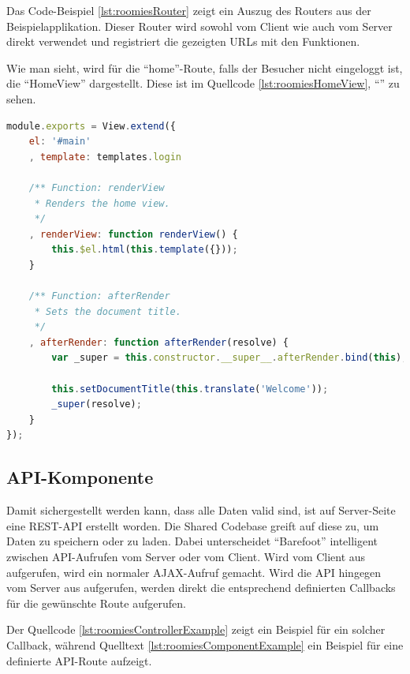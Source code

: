 Das Code-Beispiel \ref{lst:roomiesRouter} zeigt ein Auszug des Routers aus der Beispielapplikation.
Dieser Router wird sowohl vom Client wie auch vom Server direkt verwendet und registriert die gezeigten URLs mit den Funktionen.

Wie man sieht, wird für die ``home''-Route, falls der Besucher nicht eingeloggt ist, die ``HomeView'' dargestellt. Diese ist im Quellcode \ref{lst:roomiesHomeView}, ``'' zu sehen.

\begin{lstlisting}[language=JavaScript, caption=Router der Beispielapplikation, label=lst:roomiesHomeView]
module.exports = View.extend({
	el: '#main'
	, template: templates.login

	/** Function: renderView
	 * Renders the home view.
	 */
	, renderView: function renderView() {
		this.$el.html(this.template({}));
	}

	/** Function: afterRender
	 * Sets the document title.
	 */
	, afterRender: function afterRender(resolve) {
		var _super = this.constructor.__super__.afterRender.bind(this);

		this.setDocumentTitle(this.translate('Welcome'));
		_super(resolve);
	}
});
\end{lstlisting}

\subsection{API-Komponente}
Damit sichergestellt werden kann, dass alle Daten valid sind, ist auf Server-Seite
eine REST-API \cite{REST} erstellt worden. Die Shared Codebase greift auf diese zu, um
Daten zu speichern oder zu laden.
Dabei unterscheidet ``Barefoot'' intelligent zwischen API-Aufrufen vom Server oder vom Client.
Wird vom Client aus aufgerufen, wird ein normaler AJAX-Aufruf gemacht. Wird die API hingegen vom Server aus aufgerufen, werden direkt die entsprechend definierten Callbacks für die gewünschte
Route aufgerufen.

Der Quellcode \ref{lst:roomiesControllerExample} zeigt ein Beispiel für ein solcher Callback, während Quelltext \ref{lst:roomiesComponentExample} ein Beispiel für eine definierte API-Route aufzeigt.

